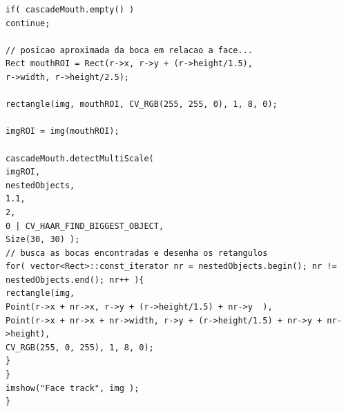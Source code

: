 \documentclass{article}
\begin{document}
\begin{lstlisting}
if( cascadeMouth.empty() )
continue;

// posicao aproximada da boca em relacao a face...
Rect mouthROI = Rect(r->x, r->y + (r->height/1.5), 
r->width, r->height/2.5);    

rectangle(img, mouthROI, CV_RGB(255, 255, 0), 1, 8, 0);

imgROI = img(mouthROI);

cascadeMouth.detectMultiScale(
imgROI,
nestedObjects,
1.1,
2,
0 | CV_HAAR_FIND_BIGGEST_OBJECT,
Size(30, 30) );
// busca as bocas encontradas e desenha os retangulos
for( vector<Rect>::const_iterator nr = nestedObjects.begin(); nr != nestedObjects.end(); nr++ ){
rectangle(img,  
Point(r->x + nr->x, r->y + (r->height/1.5) + nr->y  ),  
Point(r->x + nr->x + nr->width, r->y + (r->height/1.5) + nr->y + nr->height),  
CV_RGB(255, 0, 255), 1, 8, 0);
}
}
imshow("Face track", img );
}
	\end{lstlisting}

	
	\newpage
\end{document}

